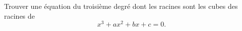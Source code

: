 Trouver une équation du troisième degré dont les racines sont les cubes des racines de
\[ x^3 + ax^2 + bx + c = 0. \]
